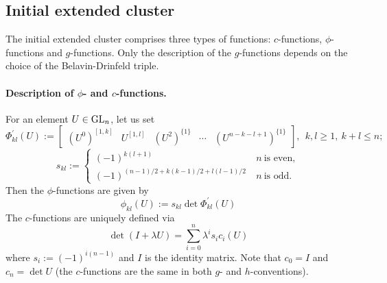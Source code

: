 \subsection{Initial extended cluster} The initial extended cluster comprises three types of functions: $c$-functions, $\phi$-functions and $g$-functions. Only the description of the $g$-functions depends on the choice of the Belavin-Drinfeld triple.

\paragraph{Description of $\phi$- and $c$-functions.}For an element $U \in \operatorname{GL}_n$, let us set
\begin{equation}\label{eq:big_phi_def_g}
\Phi_{kl}^\prime(U):=\begin{bmatrix}(U^0)^{[1,k]} & U^{[1,l]} & (U^2)^{\{1\}} & \cdots & (U^{n-k-l+1})^{\{1\}}\end{bmatrix}, \ \ k,l \geq 1, \ k+l \leq n;
\end{equation}
\begin{equation}\label{eq:s_def2}
s_{kl}:=\begin{cases}
(-1)^{k(l+1)} \ &n \ \text{is even},\\
(-1)^{(n-1)/2 + k(k-1)/2 + l(l-1)/2} \ & n \ \text{is odd}.
\end{cases}
\end{equation}
Then the $\phi$-functions are given by
\begin{equation}\label{eq:phi_g_def}
\phi_{kl}(U):=s_{kl} \det \Phi_{kl}^\prime(U)
\end{equation}
The $c$-functions are uniquely defined via
\begin{equation}\label{eq:c_def}
\det(I+\lambda U) = \sum_{i=0}^{n} \lambda^{i} s_i c_i(U)
\end{equation}
where $s_i := (-1)^{i(n-1)}$ and $I$ is the identity matrix. Note that $c_0 = I$ and $c_n = \det U$ (the $c$-functions are the same in both $g$- and $h$-conventions).


